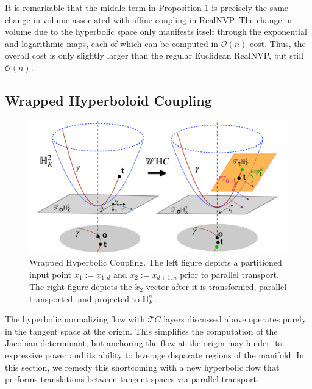 It is remarkable that the middle term in Proposition 1 is precisely the same change in volume associated with affine coupling in RealNVP.
The change in volume due to the hyperbolic space only manifests itself through the exponential and logarithmic maps, each of which can be computed in $\mathcal{O}(n)$ cost. Thus, the overall cost is only slightly larger than the regular Euclidean RealNVP, but still $\mathcal{O}(n)$.

\subsection{Wrapped Hyperboloid Coupling}
\begin{figure}[ht]
    \centering
    \includegraphics[width=0.95\linewidth]{hyperbolic_flows_arch.pdf}
    \caption{Wrapped Hyperbolic Coupling. The left figure depicts a partitioned input point $\tilde{x}_1:=\tilde{x}_{1:d}$ and $\tilde{x}_2:=\tilde{x}_{d+1:n}$ prior to parallel transport. The right figure depicts the $\tilde{x}_2$ vector after it is transformed, parallel transported, and projected to $\mathbb{H}^n_K$.}
    \label{fig:whc_architecture_diagram}
\end{figure}

\label{wrapped_hyerboloid_coupling_section}
The hyperbolic normalizing flow with $\mathcal{T}C$ layers discussed above operates purely in the tangent space at the origin.
This simplifies the computation of the Jacobian determinant, but anchoring the flow at the origin may hinder its expressive power and its ability to leverage disparate regions of the manifold. 
In this section, we remedy this shortcoming with a new hyperbolic flow that performs translations between tangent spaces via parallel transport. 

